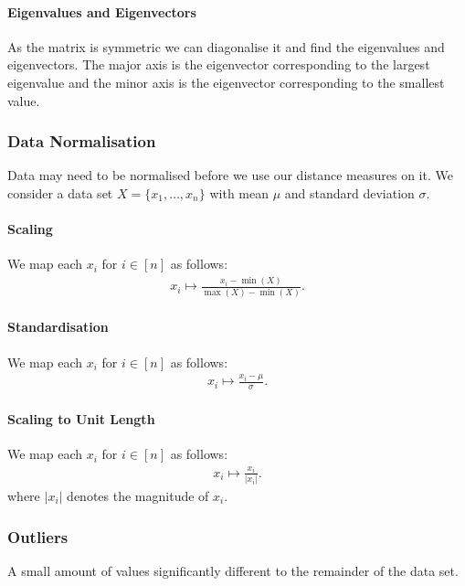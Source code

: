\paragraph{Eigenvalues and Eigenvectors} As the matrix is symmetric
we can diagonalise it and find the eigenvalues and eigenvectors.
The major axis is the eigenvector corresponding to the largest
eigenvalue and the minor axis is the eigenvector corresponding
to the smallest value.

\newpage

\subsubsection{Data Normalisation}

Data may need to be normalised before we use our distance measures
on it. We consider a data set $X = \{x_1, \ldots, x_n\}$
with mean $\mu$ and standard deviation $\sigma$.

\paragraph{Scaling} We map each $x_i$ for $i \in [n]$ as follows:
\begin{gather*}
    x_i \mapsto \frac{x_i - \min(X)}{\max(X) - \min(X)}.
\end{gather*}

\paragraph{Standardisation} We map each $x_i$ for $i \in [n]$ as follows:
\begin{gather*}
    x_i \mapsto \frac{x_i - \mu}{\sigma}.
\end{gather*}

\paragraph{Scaling to Unit Length} We map each $x_i$ for $i \in [n]$ as follows:
\begin{gather*}
    x_i \mapsto \frac{x_i}{|x_i|}.
\end{gather*} where $|x_i|$ denotes the magnitude of $x_i$.

\subsubsection{Outliers}

A small amount of values significantly different to the remainder
of the data set.